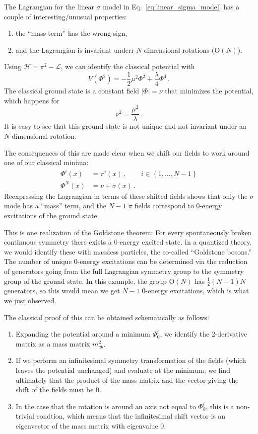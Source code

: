 \documentclass[12pt]{memoir}
\begin{document}
The Lagrangian for the linear $\sigma$ model in Eq.~\ref{eq:linear_sigma_model} has a couple of interesting/unusual properties:
\begin{enumerate}
  \item the ``mass term'' has the wrong sign,
  \item and the Lagrangian is invariant underr $N$-dimensional rotations ($\text{O}(N)$).
\end{enumerate}
Using $\mathcal{H} = \pi^2 - \mathcal{L}$, we can identify the classical potential with
\begin{equation}
  V(\Phi^2) = - \frac{1}{2} \mu^2 \Phi^2 + \frac{\lambda}{4} \Phi^4\,.
\end{equation}
The classical ground state is a constant field $\lvert\Phi\rvert = \nu$ that minimizes the potential,
which happens for
\begin{equation}
  \nu^2 = \frac{\mu^2}{\lambda}\,.
\end{equation}
It is easy to see that this ground state is not unique and not invariant under an $N$-dimensional rotation.

The consequences of this are made clear when we shift our fields to work around one of our classical minima:
\begin{align}
  \Phi^i(x) & = \pi^i(x)\,,  &i \in \left\{1,\ldots,N-1\right\}\\
  \Phi^N(x) &=  \nu + \sigma(x)\,. &
\end{align}
Reexpressing the Lagrangian in terms of these shifted fields shows that only the $\sigma$ mode has a ``mass'' term,
and the $N-1$ $\pi$ fields correspond to 0-energy excitations of the ground state.

This is one realization of the Goldstone theorem:
For every spontaneously broken continuous symmetry there exists a 0-energy excited state.
In a quantized theory, we would identify these with massless particles, the so-called ``Goldstone bosons.''
The number of unique 0-energy excitations can be determined via the reduction of generators
going from the full Lagrangian symmetry group to the symmetry group of the ground state.
In this example, the group $\text{O}(N)$ has $\frac{1}{2}(N-1)N$ generators,
so this would mean we get $N-1$ 0-energy excitations, which is what we just observed.

The classical proof of this can be obtained schematically as follows:
\begin{enumerate}
  \item Expanding the potential around a minimum $\Phi_0^i$, we identify the 2-derivative matrix as a mass matrix $m^2_{ab}$.
  \item If we perform an infinitesimal symmetry transformation of the fields
    (which leaves the potential unchanged)
    and evaluate at the minimum,
    we find ultimately that the product of the mass matrix and the vector giving the shift of the fields must be 0.
  \item In the case that the rotation is around an axis not equal to $\Phi_0^i$, this is a non-trivial condtion,
    which means that the infinitesimal shift vector is an eigenvector of the mass matrix with eigenvalue 0.
\end{enumerate}
\end{document}
